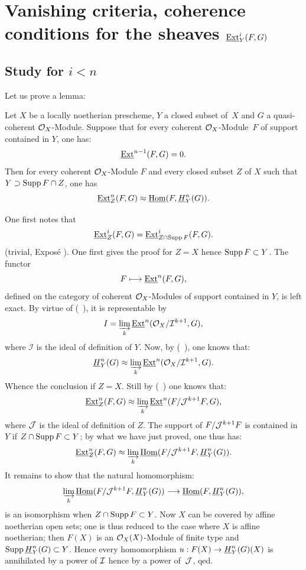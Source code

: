 \chapter[Vanishing criteria, coherence conditions]
{Vanishing criteria, coherence conditions for the sheaves $\operatorname{\underline{Ext}}^{i}_{Y}(F, G)$}\label{VII}

\renewcommand{\theequation}{\thesection.\arabic{equation}}

\section{Study for $i < n$}

Let us prove a lemma:

\begin{lemma} \label{VII.1.1}
Let $X$ be a locally noetherian prescheme, $Y$ a closed subset of~$X$ and $G$ a quasi-coherent $\mathcal{O}_X$-Module. Suppose that for every coherent $\mathcal{O}_X$-Module~$F$ of support contained in $Y$, one has:
\[
\operatorname{\underline{Ext}}^{n-1}(F, G) = 0.
\]
Then for every coherent $\mathcal{O}_X$-Module $F$ and every closed subset $Z$ of $X$ such that $Y \supset \operatorname{Supp} F \cap Z$, one has
\[
\operatorname{\underline{Ext}}^n_Z(F, G) \approx \operatorname{\underline{Hom}} (F, \underline{H}^n_Y(G)).
\]
\end{lemma}

One first notes that
\[
\operatorname{\underline{Ext}}^i_Z(F, G) = \operatorname{\underline{Ext}}^i_{Z \cap \operatorname{Supp} F}(F, G).
\]
(trivial, \cf Expos\'e ). One first gives the proof for $Z = X$ hence \hbox{$\operatorname{Supp} F \subset Y$}. The functor
\[F \mto \SheafExt^n(F, G),
\]
defined on the category of coherent $\mathcal{O}_X$-Modules of support contained in $Y$, is left exact. By virtue of (~), it is representable by
\[I = \varinjlim_{k} \operatorname{\underline{Ext}}^n (\mathcal{O}_X/\mathcal{I}^{k+1}, G),
\]
where $\mathcal{I}$ is the ideal of definition of $Y$. Now, by (~), one knows that:
\[
\underline{H}^n_Y(G) \approx \varinjlim_{k} \operatorname{\underline{Ext}}^n (\mathcal{O}_X/\mathcal{I}^{k+1}, G).
\]
Whence the conclusion if $ Z= X$. Still by (~) one knows that:
\[
\operatorname{\underline{Ext}}^n_Z (F, G) \approx \varinjlim_{k} \operatorname{\underline{Ext}}^n (F/{\mathcal J}^{k + 1}F, G),
\]
where ${\mathcal J}$ is the ideal of definition of $Z$. The support of $F/{\mathcal J}^{k+1}F$ is contained in $Y$ if $Z \cap \operatorname{Supp} F \subset Y$; by what we have just proved, one thus has:
\[
\operatorname{\underline{Ext}}^n_Z (F, G) \approx \varinjlim_{k} \operatorname{\underline{Hom}} (F/{\mathcal J}^{k + 1}F, \underline{H}^n_Y(G)).
\]
It remains to show that the natural homomorphism:
\[
\varinjlim_{k} \SheafHom (F/\Jj^{k + 1}F, \HH^n_Y(G)) \to \SheafHom (F, \HH^n_Y (G)),
\]
is an isomorphism when $Z \cap \operatorname{Supp} F \subset Y$. Now $X$ can be covered by affine noetherian open sets; one is thus reduced to the case where $X$ is affine noetherian; then $F(X)$ is an $\mathcal{O}_X(X)$-Module of finite type and $\operatorname{Supp} \underline{H}^n_Y(G) \subset Y$. Hence every homomorphism \hbox{$u: F(X) \to \HH^n_Y (G) (X)$} is annihilated by a power of ${\mathcal I}$ hence by a power of~${\mathcal J}$, \hfill qed.

